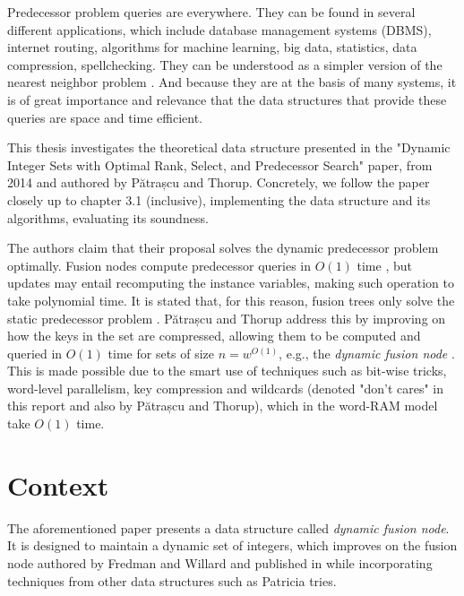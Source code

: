 
Predecessor problem queries are everywhere. They can be found in several different applications, which include database management systems (DBMS), internet routing, algorithms for machine learning, big data, statistics, data compression, spellchecking. They can be understood as a simpler version of the nearest neighbor problem \cite{bille2020massive}. And because they are at the basis of many systems, it is of great importance and relevance that the data structures that provide these queries are space and time efficient.

This thesis investigates the theoretical data structure presented in the "Dynamic Integer Sets with Optimal Rank, Select, and Predecessor Search" paper, from 2014 and authored by Pătrașcu and Thorup. Concretely, we follow the paper closely up to chapter 3.1 (inclusive), implementing the data structure and its algorithms, evaluating its soundness.

The authors claim that their proposal solves the dynamic predecessor problem optimally.
Fusion nodes compute predecessor queries in $O(1)$ time \cite{fredman1993surpassing}, but updates may entail recomputing the instance variables, making such operation to take polynomial time.
It is stated that, for this reason, fusion trees only solve the static predecessor problem \cite{nelsonjelanilec2}.
Pătrașcu and Thorup address this by improving on how the keys in the set are compressed, allowing them to be computed and queried in $O(1)$ time for sets of size $n = w^{O(1)}$, e.g., the \textit{dynamic fusion node} \cite{patrascu2014dynamic}.
This is made possible due to the smart use of techniques such as bit-wise tricks, word-level parallelism, key compression and wildcards (denoted "don't cares" in this report and also by Pătrașcu and Thorup), which in the word-RAM model take $O(1)$ time.

\section{Context}

The aforementioned paper presents a data structure called \textit{dynamic fusion node}. It is designed to maintain a dynamic set of integers, which improves on the fusion node authored by Fredman and Willard and published in \cite{fredman1993surpassing} while incorporating techniques from other data structures such as Patricia tries.

